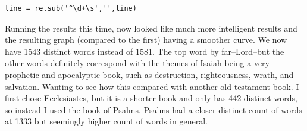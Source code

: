\documentclass[10pt]{article}
\begin{document}
\begin{verbatim}
line = re.sub('^\d+\s','',line)
\end{verbatim}
Running the results this time, now looked like much more intelligent results and the resulting graph (compared to the first) having a smoother curve. We now have 1543 distinct words instead of 1581. The top word by far--Lord--but the other words definitely correspond with the themes of Isaiah being a very prophetic and apocalyptic book, such as destruction, righteousness, wrath, and salvation. Wanting to see how this compared with another old testament book. I first chose Ecclesiastes, but it is a shorter book and only has 442 distinct words, so instead I used the book of Psalms. Psalms had a closer distinct count of words at 1333 but seemingly higher count of words in general.
\par
{}%
\hfill
{}%
\par
\pagebreak
\end{document}

